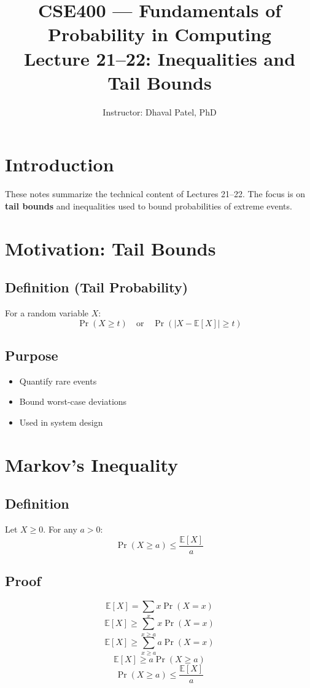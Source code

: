 \documentclass[11pt]{article}
\title{\textbf{CSE400 — Fundamentals of Probability in Computing}\\
Lecture 21–22: Inequalities and Tail Bounds}
\author{Instructor: Dhaval Patel, PhD}
\date{}
\begin{document}
\maketitle

\section{Introduction}

These notes summarize the technical content of Lectures 21–22. The focus is on \textbf{tail bounds} and inequalities used to bound probabilities of extreme events.

\section{Motivation: Tail Bounds}

\subsection*{Definition (Tail Probability)}
For a random variable $X$:
\[
\Pr(X \geq t) \quad \text{or} \quad \Pr(|X - \mathbb{E}[X]| \geq t)
\]

\subsection*{Purpose}
\begin{itemize}
\item Quantify rare events
\item Bound worst-case deviations
\item Used in system design
\end{itemize}

\section{Markov’s Inequality}

\subsection*{Definition}
Let $X \geq 0$. For any $a > 0$:
\[
\Pr(X \geq a) \leq \frac{\mathbb{E}[X]}{a}
\]

\subsection*{Proof}
\[
\mathbb{E}[X] = \sum_x x \Pr(X = x)
\]
\[
\mathbb{E}[X] \geq \sum_{x \geq a} x \Pr(X = x)
\]
\[
\mathbb{E}[X] \geq \sum_{x \geq a} a \Pr(X = x)
\]
\[
\mathbb{E}[X] \geq a \Pr(X \geq a)
\]
\[
\Pr(X \geq a) \leq \frac{\mathbb{E}[X]}{a}
\]
\end{document}
